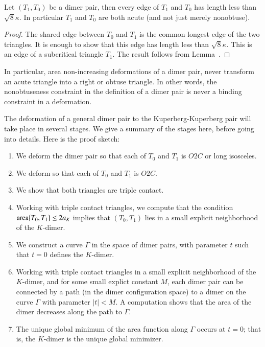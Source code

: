 \begin{lemma}  Let $(T_1,T_0)$ be a dimer pair, then every edge of $T_1$ and $T_0$ has length
less than $\sqrt8\kappa$.  In particular $T_1$ and $T_0$ are both acute (and not just merely nonobtuse).
\end{lemma}

\begin{proof}  The shared edge between $T_0$ and $T_1$ is the common longest edge of the
two triangles.  It is enough to show that this edge has length less than $\sqrt8\kappa$.
This is an edge of a subcritical triangle $T_1$. The result follows from Lemma~.
\end{proof}

In particular, area non-increasing deformations of a dimer pair, never transform an acute
triangle into a right or obtuse triangle.  In other words, the nonobtuseness constraint in the
definition of a dimer pair is never a binding constraint in a deformation.

The deformation of a general dimer pair to the Kuperberg-Kuperberg pair will take place in several
stages.  We give a summary of the stages here, before going into details.  Here is the proof sketch:

\begin{enumerate}
\item We deform the dimer pair so that each of $T_0$ and $T_1$ is $O2C$
or long isosceles.
\item We deform so that each of $T_0$ and $T_1$ is $O2C$.
\item We show that both triangles are triple contact.
\item Working with triple contact triangles, 
we compute that the condition ${\operatorname{area}}\{T_0,T_1\}\le 2a_K$ implies that
$(T_0,T_1)$ lies in a small explicit neighborhood of the $K$-dimer.
\item We construct a curve $\Gamma$ in the space of dimer pairs, with parameter $t$
such that $t=0$ defines the $K$-dimer.
\item Working with triple contact triangles in a small explicit neighborhood of the
$K$-dimer, and for some small explict constant $M$,
each dimer pair can be connected by a path (in the dimer configuration
space) to a dimer on the curve $\Gamma$ with parameter $|t|<M$.
A computation shows that the area of the dimer decreases along the path to $\Gamma$.  
\item The unique global minimum of the area function along $\Gamma$ occurs at $t=0$;
that is, the $K$-dimer is the unique global minimizer.
\end{enumerate}

